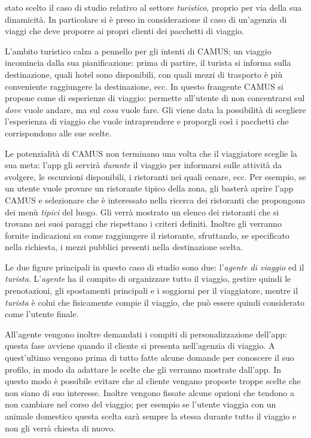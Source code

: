 \upe stato scelto il caso di studio relativo al settore \emph{turistico}, proprio per via della sua dinamicità. In particolare si è preso in considerazione il caso di un'agenzia di viaggi che deve proporre ai propri clienti dei pacchetti di viaggio.

L'ambito turistico calza a pennello per gli intenti di CAMUS; un viaggio incomincia dalla sua pianificazione: prima di partire, il turista si informa sulla destinazione, quali hotel sono disponibili, con quali mezzi di trasporto è più conveniente raggiungere la destinazione, ecc. In questo frangente CAMUS si propone come  di esperienze di viaggio: permette all'utente di non concentrarsi sul \emph{dove} vuole andare, ma sul \emph{cosa} vuole fare. Gli viene data la possibilità di scegliere l'esperienza di viaggio che vuole intraprendere e proporgli così i pacchetti che corrispondono alle sue scelte.

Le potenzialità di CAMUS non terminano una volta che il viaggiatore sceglie la sua meta: l'app gli servirà \emph{durante} il viaggio per informarsi sulle attività da svolgere, le escursioni disponibili, i ristoranti nei quali cenare, ecc. Per esempio, se un utente vuole provare un ristorante tipico della zona, gli basterà aprire l'app CAMUS e selezionare che è interessato nella ricerca dei ristoranti che propongono dei menù \emph{tipici} del luogo. Gli verrà mostrato un elenco dei ristoranti che si trovano nei suoi paraggi che rispettano i criteri definiti. Inoltre gli verranno fornite indicazioni su come raggiungere il ristorante, sfruttando, se specificato nella richiesta, i mezzi pubblici presenti nella destinazione scelta.

Le due figure principali in questo caso di studio sono due: l'\emph{agente di viaggio} ed il \emph{turista}. L'\emph{agente} ha il compito di organizzare tutto il viaggio, gestire quindi le prenotazioni, gli spostamenti principali e i soggiorni per il viaggiatore, mentre il \emph{turista} è colui che fisicamente compie il viaggio, che può essere quindi considerato come l'utente finale.

All'agente vengono inoltre demandati i compiti di personalizzazione dell'app: questa fase avviene quando il cliente si presenta nell'agenzia di viaggio. A quest'ultimo vengono prima di tutto fatte alcune domande per conoscere il suo profilo, in modo da adattare le scelte che gli verranno mostrate dall'app. In questo modo è possibile evitare che al cliente vengano proposte troppe scelte che non siano di suo interesse. Inoltre vengono fissate alcune opzioni che tendono a non cambiare nel corso del viaggio; per esempio se l'utente viaggia con un animale domestico questa scelta sarà sempre la stessa durante tutto il viaggio e non gli verrà chiesta di nuovo.%

